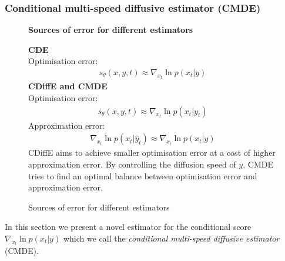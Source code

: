 


\subsubsection{Conditional multi-speed diffusive estimator (CMDE)}
\label{ch2:sec:CMDE}
\begin{figure}
\begin{mdframed}
    \begin{center}
       \textbf{Sources of error for different estimators}
    \end{center}
    \textbf{CDE}\\
    Optimisation error:
    \begin{gather*}
    s_\theta(x,y,t) \approx \nabla_{x_t}\ln p(x_t|y)   
    \end{gather*}
    \textbf{CDiffE and CMDE}\\
    Optimisation error:
    \begin{gather*}
        s_\theta(x,y,t) \approx \nabla_{x_t}\ln p(x_t|y_t)   
        \end{gather*}
    Approximation error:
    \begin{gather*}
        \nabla_{x_t}\ln p(x_t|\hat{y}_t) \approx \nabla_{x_t}\ln p(x_t|y)   
        \end{gather*}
    CDiffE aims to achieve smaller optimisation error at a cost of higher approximation error. By controlling the diffusion speed of $y$, CMDE tries to find an optimal balance between optimisation error and approximation error.
\end{mdframed}
\caption{Sources of error for different estimators}
\label{ch2:fig:box}
\end{figure}
In this section we present a novel estimator for the conditional score $\nabla_{x_t} \ln p(x_t | y)$ which we call the \textit{conditional multi-speed diffusive estimator} (CMDE). 

